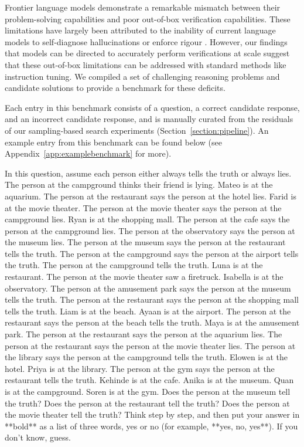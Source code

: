 Frontier language models demonstrate a remarkable mismatch between their problem-solving capabilities and poor out-of-box verification capabilities.
These limitations have largely been attributed to the inability of current language models to self-diagnose hallucinations or enforce rigour \citep{zhang_how_2023,orgad_llms_2024,snyder_early_2024,kamoi_evaluating_2024, tyen_llms_2024, DBLP:conf/iclr/0009CMZYSZ24}.
However, our findings that models can be directed to accurately perform verifications at scale suggest that these out-of-box limitations can be addressed with standard methods like instruction tuning.
We compiled a set of challenging reasoning problems and candidate solutions to provide a benchmark for these deficits.

Each entry in this benchmark consists of a question, a correct candidate response, and an incorrect candidate response, and is manually curated from the residuals of our sampling-based search experiments (Section~\ref{section:pipeline}).
An example entry from this benchmark can be found below (see Appendix~\ref{app:examplebenchmark} for more).

\vspace{0.4cm}
\begin{tcolorbox}[title=Question from LiveBench Reasoning (Web-of-Lies Puzzle), breakable]
In this question, assume each person either always tells the truth or always lies. The person at the campground thinks their friend is lying. Mateo is at the aquarium. The person at the restaurant says the person at the hotel lies. Farid is at the movie theater. The person at the movie theater says the person at the campground lies. Ryan is at the shopping mall. The person at the cafe says the person at the campground lies. The person at the observatory says the person at the museum lies. The person at the museum says the person at the restaurant tells the truth. The person at the campground says the person at the airport tells the truth. The person at the campground tells the truth. Luna is at the restaurant. The person at the movie theater saw a firetruck. Isabella is at the observatory. The person at the amusement park says the person at the museum tells the truth. The person at the restaurant says the person at the shopping mall tells the truth. Liam is at the beach. Ayaan is at the airport. The person at the restaurant says the person at the beach tells the truth. Maya is at the amusement park. The person at the restaurant says the person at the aquarium lies. The person at the restaurant says the person at the movie theater lies. The person at the library says the person at the campground tells the truth. Elowen is at the hotel. Priya is at the library. The person at the gym says the person at the restaurant tells the truth. Kehinde is at the cafe. Anika is at the museum. Quan is at the campground. Soren is at the gym. Does the person at the museum tell the truth? Does the person at the restaurant tell the truth? Does the person at the movie theater tell the truth? Think step by step, and then put your answer in **bold** as a list of three words, yes or no (for example, **yes, no, yes**). If you don't know, guess.
\end{tcolorbox}


